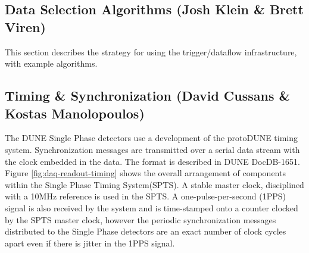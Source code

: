 

\subsection{Data Selection Algorithms (Josh Klein \& Brett Viren)}
\label{sec:fdsp-daq-sel}

This section describes the strategy for using the trigger/dataflow infrastructure, with example algorithms.



%
%
%

\subsection{Timing \& Synchronization (David Cussans \& Kostas Manolopoulos)}
\label{sec:fdsp-daq-timing}


The DUNE Single Phase detectors use a development of the protoDUNE
timing system. Synchronization messages are transmitted over a serial
data stream with the clock embedded in the data. The format is
described in DUNE DocDB-1651. Figure \ref{fig:daq-readout-timing}
shows the overall arrangement of components within the Single Phase
Timing System(SPTS). A stable master clock, disciplined with a 10MHz
reference is used in the SPTS. A one-pulse-per-second (1PPS) signal is
also received by the system and is time-stamped onto a counter clocked
by the SPTS master clock, however the periodic synchronization
messages distributed to the Single Phase detectors are an exact number
of clock cycles apart even if there is jitter in the 1PPS signal.

